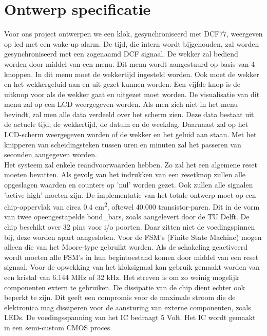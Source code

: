 \chapter{Ontwerp specificatie}
Voor ons project ontwerpen we een klok, gesynchroniseerd met DCF77, weergeven op lcd met een wake-up alarm. De tijd, die intern wordt bijgehouden, zal worden gesynchroniseerd met een zogenaamd DCF signaal. De wekker zal bediend worden door middel van een menu. Dit menu wordt aangestuurd op basis van 4 knoppen. In dit menu moet de wekkertijd ingesteld worden. Ook moet de wekker en het wekkergeluid aan en uit gezet kunnen worden. Een vijfde knop is de uitknop voor als de wekker gaat en uitgezet moet worden. De visualisatie van dit menu zal op een LCD weergegeven worden. Als men zich niet in het menu bevindt, zal men alle data verdeeld over het scherm zien. Deze data bestaat uit de actuele tijd, de wekkertijd, de datum en de weekdag. Daarnaast zal op het LCD-scherm weergegeven worden of de wekker en het geluid aan staan. Met het knipperen van scheidingsteken tussen uren en minuten zal het passeren van seconden aangegeven worden.\\

Het systeem zal enkele reandvoorwaarden hebben. Zo zal het een algemene reset moeten bevatten. Als gevolg van het indrukken van een resetknop zullen alle opgeslagen waarden en counters op 'nul' worden gezet. Ook zullen alle signalen 'active high' moeten zijn. De implementatie van het totale ontwerp moet op een chip-oppervlak van circa 0.4 cm\textsuperscript{2}, oftewel 40.000 transistor-paren. Dit in de vorm van twee opeengestapelde bond_bars, zoals aangelevert door de TU Delft. De chip beschikt over 32 pins voor i/o poorten. Daar zitten niet de voedingspinnen bij, deze worden apart aangesloten. Voor de FSM’s (Finite State Machine) mogen alleen die van het Moore-type gebruikt worden. Als de schakeling geactiveerd wordt moeten alle FSM’s in hun begintoestand komen door middel van een reset signaal. Voor de opwekking van het kloksignaal kan gebruik gemaakt worden van een kristal van 6.144 MHz of 32 kHz. Het streven is om zo weinig mogelijk componenten extern te gebruiken. De dissipatie van de chip dient echter ook beperkt te zijn. Dit geeft een compromis voor de maximale stroom die de elektronica mag dissiperen voor de aansturing van externe componenten, zoals LEDs. De voedingsspanning van het IC bedraagt 5 Volt. Het IC wordt gemaakt in een semi-custom CMOS proces. ~\cite{handleiding}\\

